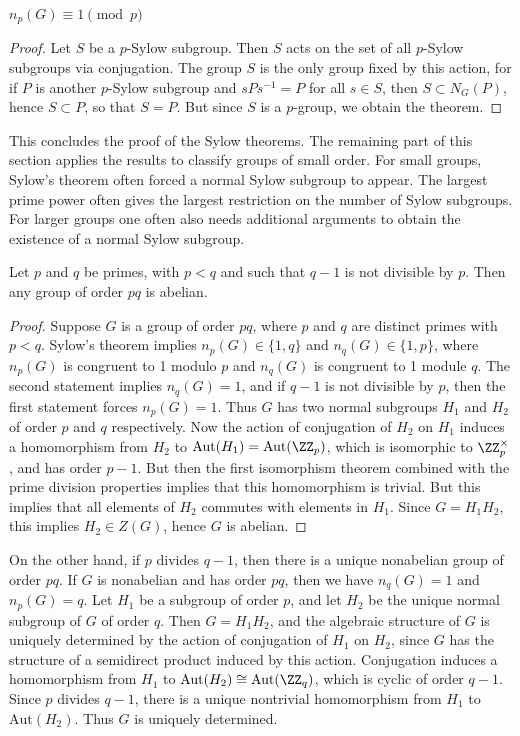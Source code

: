 \begin{theorem}
    $n_p(G) \equiv 1 \pmod{p}$
\end{theorem}
\begin{proof}
    Let $S$ be a $p$-Sylow subgroup. Then $S$ acts on the set of all $p$-Sylow subgroups via conjugation. The group $S$ is the only group fixed by this action, for if $P$ is another $p$-Sylow subgroup and $sPs^{-1} = P$ for all $s \in S$, then $S \subset N_G(P)$, hence $S \subset P$, so that $S = P$. But since $S$ is a $p$-group, we obtain the theorem.
\end{proof}

This concludes the proof of the Sylow theorems. The remaining part of this section applies the results to classify groups of small order. For small groups, Sylow's theorem often forced a normal Sylow subgroup to appear. The largest prime power often gives the largest restriction on the number of Sylow subgroups. For larger groups one often also needs additional arguments to obtain the existence of a normal Sylow subgroup.

\begin{theorem}
    Let $p$ and $q$ be primes, with $p < q$ and such that $q-1$ is not divisible by $p$. Then any group of order $pq$ is abelian.
\end{theorem}
\begin{proof}
    Suppose $G$ is a group of order $pq$, where $p$ and $q$ are distinct primes with $p < q$. Sylow's theorem implies $n_p(G) \in \{ 1, q \}$ and $n_q(G) \in \{ 1, p \}$, where $n_p(G)$ is congruent to 1 modulo $p$ and $n_q(G)$ is congruent to 1 module $q$. The second statement implies $n_q(G) = 1$, and if $q - 1$ is not divisible by $p$, then the first statement forces $n_p(G) = 1$. Thus $G$ has two normal subgroups $H_1$ and $H_2$ of order $p$ and $q$ respectively. Now the action of conjugation of $H_2$ on $H_1$ induces a homomorphism from $H_2$ to $\text{Aut}(H_1) = \text{Aut}(\ZZ_p)$, which is isomorphic to $\ZZ_p^\times$, and has order $p-1$. But then the first isomorphism theorem combined with the prime division properties implies that this homomorphism is trivial. But this implies that all elements of $H_2$ commutes with elements in $H_1$. Since $G = H_1H_2$, this implies $H_2 \in Z(G)$, hence $G$ is abelian.
\end{proof}

\begin{remark}
    On the other hand, if $p$ divides $q-1$, then there is a unique nonabelian group of order $pq$. If $G$ is nonabelian and has order $pq$, then we have $n_q(G) = 1$ and $n_p(G) = q$. Let $H_1$ be a subgroup of order $p$, and let $H_2$ be the unique normal subgroup of $G$ of order $q$. Then $G = H_1H_2$, and the algebraic structure of $G$ is uniquely determined by the action of conjugation of $H_1$ on $H_2$, since $G$ has the structure of a semidirect product induced by this action. Conjugation induces a homomorphism from $H_1$ to $\text{Aut}(H_2) \cong \text{Aut}(\ZZ_q)$, which is cyclic of order $q-1$. Since $p$ divides $q-1$, there is a unique nontrivial homomorphism from $H_1$ to $\text{Aut}(H_2)$. Thus $G$ is uniquely determined.
\end{remark}

